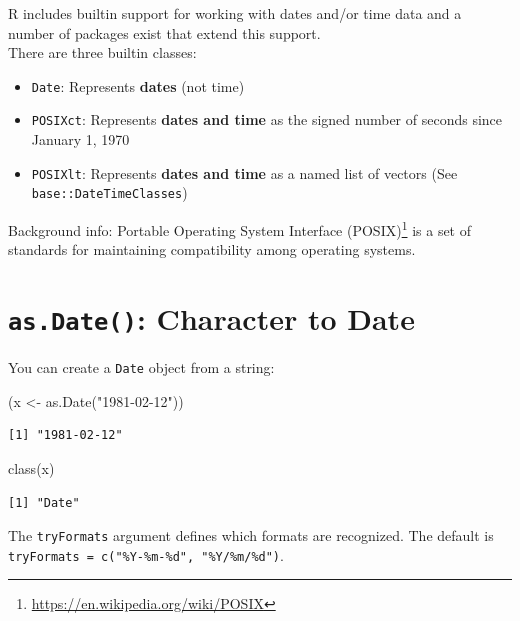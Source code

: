 \documentclass[
]{book}
\newenvironment{Shaded}{\begin{snugshade}}{\end{snugshade}}
\newcommand{\FunctionTok}[1]{\textcolor[rgb]{0.00,0.00,0.00}{#1}}
\newcommand{\NormalTok}[1]{#1}
\newcommand{\OtherTok}[1]{\textcolor[rgb]{0.56,0.35,0.01}{#1}}
\newcommand{\StringTok}[1]{\textcolor[rgb]{0.31,0.60,0.02}{#1}}
\DeclareRobustCommand{\href}[2]{#2\footnote{\url{#1}}}
\providecommand{\tightlist}{%
  \setlength{\itemsep}{0pt}\setlength{\parskip}{0pt}}
\renewcommand{\href}[2]{#2\footnote{\url{#1}}}
\begin{document}
R includes builtin support for working with dates and/or time data and a number of packages exist that extend this support.\\
There are three builtin classes:

\begin{itemize}
\tightlist
\item
  \texttt{Date}: Represents \textbf{dates} (not time)
\item
  \texttt{POSIXct}: Represents \textbf{dates and time} as the signed number of seconds since January 1, 1970
\item
  \texttt{POSIXlt}: Represents \textbf{dates and time} as a named list of vectors (See \texttt{base::DateTimeClasses})
\end{itemize}

Background info: \href{https://en.wikipedia.org/wiki/POSIX}{Portable Operating System Interface (POSIX)} is a set of standards for maintaining compatibility among operating systems.

\hypertarget{as.date-character-to-date}{%
\section{\texorpdfstring{\texttt{as.Date()}: Character to Date}{as.Date(): Character to Date}}\label{as.date-character-to-date}}

You can create a \texttt{Date} object from a string:

\begin{Shaded}
\begin{Highlighting}[]
\NormalTok{(x }\OtherTok{\textless{}{-}} \FunctionTok{as.Date}\NormalTok{(}\StringTok{"1981{-}02{-}12"}\NormalTok{))}
\end{Highlighting}
\end{Shaded}

\begin{verbatim}
[1] "1981-02-12"
\end{verbatim}

\begin{Shaded}
\begin{Highlighting}[]
\FunctionTok{class}\NormalTok{(x)}
\end{Highlighting}
\end{Shaded}

\begin{verbatim}
[1] "Date"
\end{verbatim}

The \texttt{tryFormats} argument defines which formats are recognized. The default is \texttt{tryFormats\ =\ c("\%Y-\%m-\%d",\ "\%Y/\%m/\%d")}.
\end{document}
